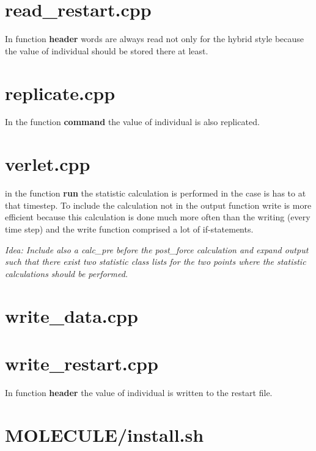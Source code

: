 \section{read\_restart.cpp}

In function \textbf{header} words are always read not only for the hybrid style because the value of individual should be stored there at least.
 
\section{replicate.cpp}

In the function \textbf{command} the value of individual is also replicated.

 
\section{verlet.cpp}

in the function \textbf{run} the statistic calculation is performed in the case is has to at that timestep. To include the calculation not in the output function write is more efficient because this calculation is done much more often than the writing (every time step) and the write function comprised a lot of if-statements.

\textit{Idea: Include also a calc\_pre before the post\_force calculation and expand output such that there exist two statistic class lists for the two points where the statistic calculations should be performed.}


\section{write\_data.cpp}


\section{write\_restart.cpp}

In function \textbf{header} the value of individual is written to the restart file.


\section{MOLECULE/install.sh}
